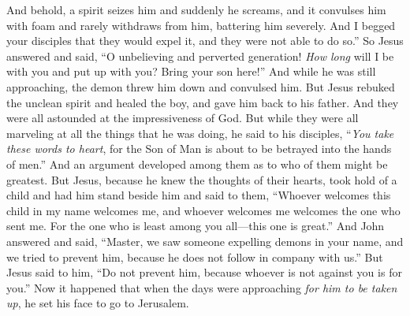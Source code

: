 \begin{biblechapter}
\verse And behold, a spirit seizes him and suddenly he screams, and it convulses him with foam and rarely withdraws from him, battering him severely.
\verse And I begged your disciples that they would expel it, and they were not able to do so.”
\verse So Jesus answered and said, “O unbelieving and perverted generation! \textit{How long} will I be with you and put up with you? Bring your son here!”
\verse And while he was still approaching, the demon threw him down and convulsed him. But Jesus rebuked the unclean spirit and healed the boy, and gave him back to his father.
\verse And they were all astounded at the impressiveness of God.
 But while they were all marveling at all the things that he was doing, he said to his disciples,
\verse “\textit{You take these words to heart}, for the Son of Man is about to be betrayed into the hands of men.”
 And an argument developed among them as to who of them might be greatest.
\verse But Jesus, because he knew the thoughts of their hearts, took hold of a child and had him stand beside him
\verse and said to them, “Whoever welcomes this child in my name welcomes me, and whoever welcomes me welcomes the one who sent me. For the one who is least among you all—this one is great.”
 And John answered and said, “Master, we saw someone expelling demons in your name, and we tried to prevent him, because he does not follow in company with us.”
\verse But Jesus said to him, “Do not prevent him, because whoever is not against you is for you.”
 Now it happened that when the days were approaching \textit{for him to be taken up}, he set his face to go to Jerusalem.

\end{biblechapter}
